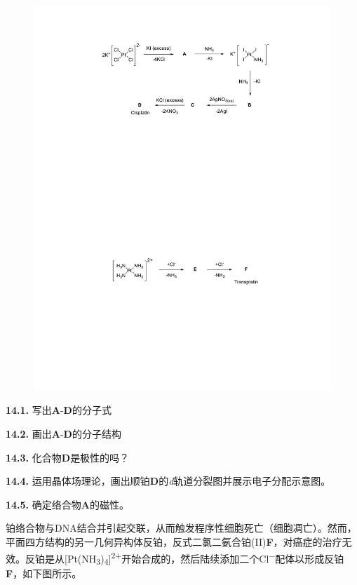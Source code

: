 \begin{figure}[h]
	\centering
	\includegraphics[width=13cm]{./pic/t14-2.pdf}
\end{figure}

\noindent\textbf{14.1.} 写出\textbf{A}-\textbf{D}的分子式

\noindent\textbf{14.2.} 画出\textbf{A}-\textbf{D}的分子结构

\noindent\textbf{14.3.} 化合物\textbf{D}是极性的吗？

\noindent\textbf{14.4.} 运用晶体场理论，画出顺铂\textbf{D}的\textit{d}轨道分裂图并展示电子分配示意图。

\noindent\textbf{14.5.} 确定络合物\textbf{A}的磁性。

铂络合物与DNA结合并引起交联，从而触发程序性细胞死亡（细胞凋亡）。然而，平面四方结构的另一几何异构体反铂，反式二氯二氨合铂(II)\textbf{F}，对癌症的治疗无效。反铂是从[Pt(NH\textsubscript{3})\textsubscript{4}]\textsuperscript{2+}开始合成的，然后陆续添加二个Cl\textsuperscript{−}配体以形成反铂\textbf{F}，如下图所示。

